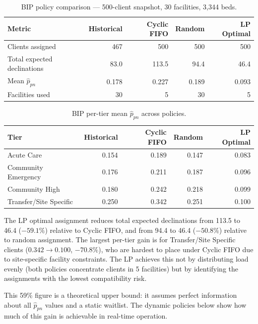 \begin{table}[H]
\centering
\caption{BIP policy comparison --- 500-client snapshot, 30 facilities, 3{,}344 beds.}
\label{tab:bip_results}
\begin{tabular}{lrrrr}
\toprule
\textbf{Metric} & \textbf{Historical} & \textbf{Cyclic FIFO} & \textbf{Random} & \textbf{LP Optimal} \\
\midrule
Clients assigned             & 467   & 500   & 500  & 500 \\
Total expected declinations  & 83.0  & 113.5 & 94.4 & 46.4 \\
Mean $\hat{p}_{pn}$          & 0.178 & 0.227 & 0.189 & 0.093 \\
Facilities used              & 30    & 5     & 30   & 5 \\
\bottomrule
\end{tabular}
\end{table}

\begin{table}[H]
\centering
\caption{BIP per-tier mean $\hat{p}_{pn}$ across policies.}
\label{tab:bip_tier}
\begin{tabular}{lrrrr}
\toprule
\textbf{Tier} & \textbf{Historical} & \textbf{Cyclic FIFO} & \textbf{Random} & \textbf{LP Optimal} \\
\midrule
Acute Care             & 0.154 & 0.189 & 0.147 & 0.083 \\
Community Emergency    & 0.176 & 0.211 & 0.187 & 0.096 \\
Community High         & 0.180 & 0.242 & 0.218 & 0.099 \\
Transfer/Site Specific & 0.250 & 0.342 & 0.251 & 0.100 \\
\bottomrule
\end{tabular}
\end{table}

\noindent
The LP optimal assignment reduces total expected declinations from 113.5 to 46.4
($-59.1\%$) relative to Cyclic FIFO, and from 94.4 to 46.4 ($-50.8\%$) relative to
random assignment.  The largest per-tier gain is for Transfer/Site Specific clients
($0.342 \to 0.100$, $-70.8\%$), who are hardest to place under Cyclic FIFO due to
site-specific facility constraints.  The LP achieves this not by distributing load
evenly (both policies concentrate clients in 5 facilities) but by identifying the
assignments with the lowest compatibility risk.

This 59\% figure is a theoretical upper bound: it assumes perfect information about all
$\hat{p}_{pn}$ values and a static waitlist.  The dynamic policies below show how much
of this gain is achievable in real-time operation.

